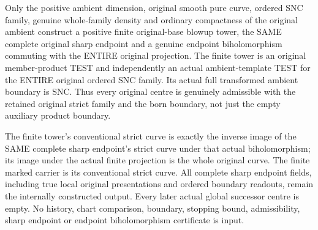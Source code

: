 \begin{theorem}
\label{hir:sharp-actual-curve-original-compact-admissible-sharp-history}
\leanok
Only the positive ambient dimension, original smooth pure curve, ordered
SNC family, genuine whole-family density and ordinary compactness of the
original ambient construct a positive finite original-base blowup tower,
the SAME complete original sharp endpoint and a genuine endpoint
biholomorphism commuting with the ENTIRE original projection. The finite
tower is an original member-product TEST and independently an actual
ambient-template TEST for the ENTIRE original ordered SNC family. Its
actual full transformed ambient boundary is SNC. Thus every original
centre is genuinely admissible with the retained original strict family
and the born boundary, not just the empty auxiliary product boundary.

The finite tower's conventional strict curve is exactly the inverse image
of the SAME complete sharp endpoint's strict curve under that actual
biholomorphism; its image under the actual finite projection is the whole
original curve. The finite marked carrier is its conventional strict
curve. All complete sharp endpoint fields, including true local original
presentations and ordered boundary readouts, remain the internally
constructed output. Every later actual global successor centre is empty.
No history, chart comparison, boundary, stopping bound, admissibility,
sharp endpoint or endpoint biholomorphism certificate is input.
\end{theorem}
